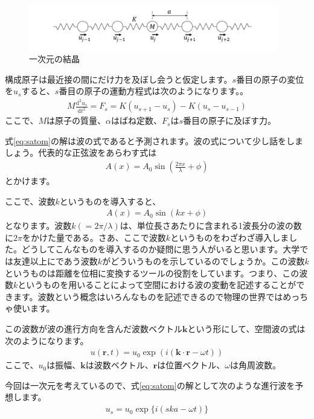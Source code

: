 \documentclass[10pt,b5paper,papersize,dvipdfmx]{jsbook}
\begin{document}
\begin{figure}[htbp]
  \centering
  \includegraphics[height=2cm]{img/bane.pdf}  %
  \caption{一次元の結晶}
  \label{fig:bane}
\end{figure}
構成原子は最近接の間にだけ力を及ぼし会うと仮定します。$s$番目の原子の変位を$u_s$すると、$s$番目の原子の運動方程式は次のようになります。。
\begin{align}
  M\frac{\mathrm{d}^2u_s}{\mathrm{d}t^2} = F_s = K (u_{s+1} - u_s) - K (u_s - u_{s-1})
  \label{eq:satom}
\end{align}
ここで、$M$は原子の質量、$\alpha$はばね定数、$F_s$は$s$番目の原子に及ぼす力。\par
式\ref{eq:satom}の解は波の式であると予測されます。波の式について少し話をしましょう。代表的な正弦波をあらわす式は
\begin{align}
  A(x) = A_0 \sin \left(\frac{2\pi x}{\lambda} + \phi \right)
\end{align}
とかけます。\par
ここで、波数$k$というものを導入すると、
\begin{align}
  A(x) = A_0 \sin (kx + \phi)
\end{align}
となります。波数$k (= 2\pi/\lambda)$は、単位長さあたりに含まれる1波長分の波の数に$2\pi$をかけた量である。さあ、ここで波数$k$というものをわざわざ導入しました。どうしてこんなものを導入するのか疑問に思う人がいると思います。大学では友達以上にであう波数$k$がどういうものを示しているのでしょうか。この波数$k$というものは距離を位相に変換するツールの役割をしています。つまり、この波数$k$というものを用いることによって空間における波の変動を記述することができます。波数という概念はいろんなものを記述できるので物理の世界ではめっちゃ使います。\par
この波数が波の進行方向を含んだ波数ベクトル$\bm{k}$という形にして、空間波の式は次のようになります。
\begin{align}
  u(\bm{r},t) = u_0 \exp(i(\bm{k} \cdot \bm{r} - \omega t))
\end{align}
ここで、$u_0$は振幅、$\bm{k}$は波数ベクトル、$\bm{r}$は位置ベクトル、$\omega$は角周波数。\par
今回は一次元を考えているので、式\ref{eq:satom}の解として次のような進行波を予想します。
\begin{align}
  u_s = u_0 \exp\{i(ska - \omega t)\}
\end{align}
\end{document}
